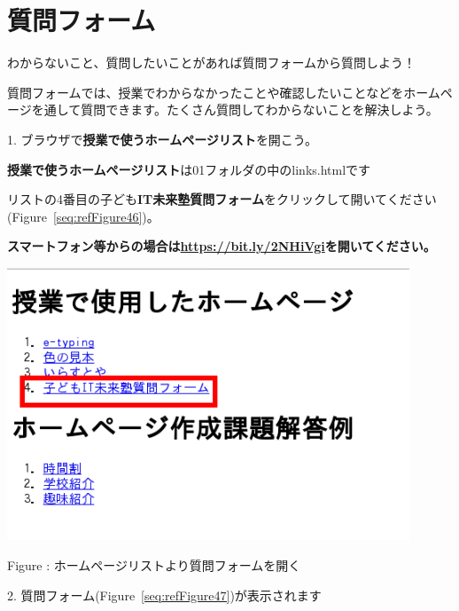 \documentclass[a4paper,12pt]{jarticle}
\begin{document}
\section{質問フォーム}
わからないこと、質問したいことがあれば質問フォームから質問しよう！

質問フォームでは、授業でわからなかったことや確認したいことなどをホームページを通して質問できます。たくさん質問してわからないことを解決しよう。

1.
ブラウザで\textbf{授業で使うホームページリスト}を開こう。

\textbf{授業で使うホームページリスト}は01フォルダの中のlinks.htmlです

リストの4番目の子ども\textbf{IT未来塾質問フォーム}をクリックして開いてください(Figure~\ref{seq:refFigure46})。


\bigskip

{\bfseries
  スマートフォン等からの場合は\url{https://bit.ly/2NHiVgi}を開いてください。}



\centering
\begin{minipage}{\textwidth}
  {\upshape
    \includegraphics[width=0.9\textwidth]{textbook-img245.png}
    \flushleft

    \bigskip
    Figure {\theFigure\label{seq:refFigure46}}:
    ホームページリストより質問フォームを開く}
\end{minipage}

\bigskip

\bigskip

2.
質問フォーム(Figure~\ref{seq:refFigure47})が表示されます
\end{document}
